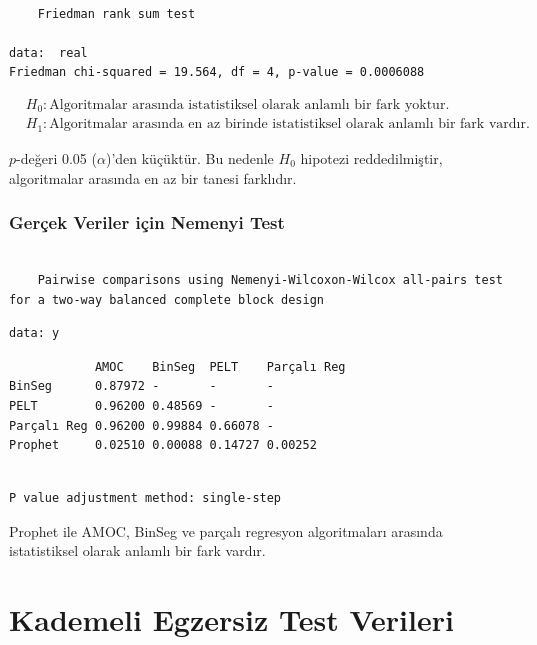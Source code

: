 \documentclass[12pt,twoside]{deuthesis}
\begin{document}
\begin{verbatim}

    Friedman rank sum test

data:  real
Friedman chi-squared = 19.564, df = 4, p-value = 0.0006088
\end{verbatim}

\begin{align*}
& H_0: \text{Algoritmalar arasında istatistiksel olarak anlamlı bir fark yoktur.} \\
& H_1: \text{Algoritmalar arasında en az birinde istatistiksel olarak anlamlı bir fark vardır.}
\end{align*}

\(p\)-değeri 0.05 (\(\alpha\))'den küçüktür. Bu nedenle \(H_0\) hipotezi reddedilmiştir, algoritmalar arasında en az bir tanesi farklıdır.

\hypertarget{geruxe7ek-veriler-iuxe7in-nemenyi-test}{%
\subsubsection{Gerçek Veriler için Nemenyi Test}\label{geruxe7ek-veriler-iuxe7in-nemenyi-test}}

\begin{verbatim}

    Pairwise comparisons using Nemenyi-Wilcoxon-Wilcox all-pairs test for a two-way balanced complete block design
\end{verbatim}

\begin{verbatim}
data: y
\end{verbatim}

\begin{verbatim}
            AMOC    BinSeg  PELT    Parçalı Reg
BinSeg      0.87972 -       -       -          
PELT        0.96200 0.48569 -       -          
Parçalı Reg 0.96200 0.99884 0.66078 -          
Prophet     0.02510 0.00088 0.14727 0.00252    
\end{verbatim}

\begin{verbatim}

P value adjustment method: single-step
\end{verbatim}

Prophet ile AMOC, BinSeg ve parçalı regresyon algoritmaları arasında istatistiksel olarak anlamlı bir fark vardır.

\hypertarget{kademeli-egzersiz-test-verileri}{%
\section{Kademeli Egzersiz Test Verileri}\label{kademeli-egzersiz-test-verileri}}
\end{document}
